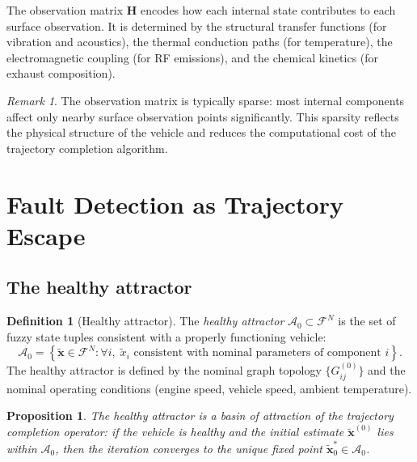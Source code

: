 \documentclass[twocolumn,10pt,a4paper]{article}
\newtheorem{proposition}[theorem]{Proposition}
\theoremstyle{definition}
\newtheorem{definition}[theorem]{Definition}
\theoremstyle{remark}
\newtheorem{remark}[theorem]{Remark}
\newcommand{\Fcal}{\mathcal{F}}
\newcommand{\vect}[1]{\boldsymbol{#1}}
\newcommand{\mat}[1]{\mathbf{#1}}
\newcommand{\fuzzy}[1]{\widetilde{#1}}
\begin{document}
The observation matrix $\mat{H}$ encodes how each internal state contributes to each surface observation. It is determined by the structural transfer functions (for vibration and acoustics), the thermal conduction paths (for temperature), the electromagnetic coupling (for RF emissions), and the chemical kinetics (for exhaust composition).

\begin{remark}
The observation matrix is typically sparse: most internal components affect only nearby surface observation points significantly. This sparsity reflects the physical structure of the vehicle and reduces the computational cost of the trajectory completion algorithm.
\end{remark}




\section{Fault Detection as Trajectory Escape}\label{sec:fault}

\subsection{The healthy attractor}

\begin{definition}[Healthy attractor]\label{def:healthy_attractor}
The \emph{healthy attractor} $\mathcal{A}_0 \subset \Fcal^N$ is the set of fuzzy state tuples consistent with a properly functioning vehicle:
\begin{equation}\label{eq:healthy_attractor}
\mathcal{A}_0 = \left\{\fuzzy{\vect{x}} \in \Fcal^N : \forall i, \; \fuzzy{x}_i \text{ consistent with nominal parameters of component } i\right\}.
\end{equation}
The healthy attractor is defined by the nominal graph topology $\{G_{ij}^{(0)}\}$ and the nominal operating conditions (engine speed, vehicle speed, ambient temperature).
\end{definition}

\begin{proposition}\label{prop:attractor_basin}
The healthy attractor is a basin of attraction of the trajectory completion operator: if the vehicle is healthy and the initial estimate $\fuzzy{\vect{x}}^{(0)}$ lies within $\mathcal{A}_0$, then the iteration converges to the unique fixed point $\fuzzy{\vect{x}}^*_0 \in \mathcal{A}_0$.
\end{proposition}
\end{document}
